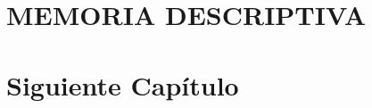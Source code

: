 \documentclass[12pt,a4paper,oneside]{report}
\begin{document}
	\begin{titlepage}
		
	\end{titlepage}
	
	
	
	\chapter*{}
	
	
	\chapter*{}
	
	
	\tableofcontents
	
	\chapter{MEMORIA DESCRIPTIVA}
	
	
	\chapter{Siguiente Capítulo}
	
	

	 
	
\end{document}
